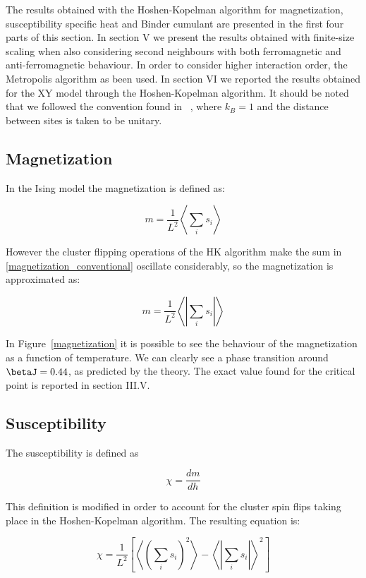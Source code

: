 \documentclass[twoside]{article}
\def\mean#1{\left< #1 \right>}
\begin{document}
\begin{multicols}{2}
The results obtained with the Hoshen-Kopelman algorithm for magnetization, susceptibility specific heat and Binder cumulant are presented in the first four parts of this section.
In section V we present the results obtained with finite-size scaling when also considering second neighbours with both ferromagnetic and anti-ferromagnetic behaviour. In order to consider higher interaction order, the Metropolis algorithm as been used.
In section VI we reported the results obtained for the XY model through the Hoshen-Kopelman algorithm.
It should be noted that we followed the convention found in ~\cite{thijssen}, where $k_B = 1$ and the distance between sites is taken to be unitary.

\subsection{Magnetization}
In the Ising model the magnetization is defined as:

\begin{equation}
m = \frac{1}{L^2} \mean{\sum_i s_i}
\label{magnetization_conventional}
\end{equation}

However the cluster flipping operations of the HK algorithm make the sum in \ref{magnetization_conventional} oscillate considerably, so the magnetization is approximated as:

\begin{equation}
m = \frac{1}{L^2} \mean{\left|\sum_i s_i\right|}
\end{equation}

In Figure~\ref{magnetization} it is possible to see the behaviour of the magnetization as a function of temperature. We can clearly see a phase transition around $\betaJ = 0.44$, as predicted by the theory. The exact value found for the critical point is reported in section III.V.

\subsection{Susceptibility}
The susceptibility is defined as 

\begin{equation}
\chi = \frac{dm}{dh}
\end{equation}

This definition is modified in order to account for the cluster spin flips taking place in the Hoshen-Kopelman algorithm. The resulting equation is:

\begin{equation}
\chi = \frac{1}{L^2}\left[\mean{\left(\sum_i s_i\right)^2} - \mean{\left|\sum_i s_i \right|}^2\right]
\end{equation}


\end{multicols}
\end{document}

